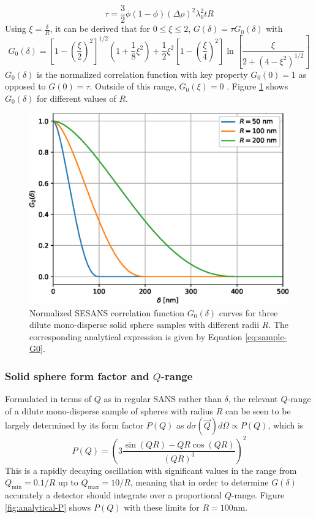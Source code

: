 \documentclass{article}
\begin{document}
\begin{equation}
	\tau = \frac{3}{2}\phi (1 - \phi) (\Delta\rho)^2\lambda_0^2tR \label{eq:sample-tau}
\end{equation}
Using $\xi = \frac{\delta}{R}$, it can be derived that for $0\leq \xi \leq 2$, $G(\delta) = \tau G_0(\delta)$ with 
\begin{equation}
	G_0(\delta) = \left[1 - \left(\frac{\xi}{2}\right)^2\right]^{1/2}\left(1 + \frac{1}{8}\xi^2\right) + \frac{1}{2}\xi^2\left[1 - \left(\frac{\xi}{4}\right)^2\right]\ln \left[\frac{\xi}{2 + (4 - \xi^2)^{1/2}}\right] \label{eq:sample-G0}
\end{equation}
$G_0(\delta)$ is the normalized correlation function with key property $G_0(0) = 1$ as opposed to $G(0) = \tau$. Outside of this range, $G_0(\xi) = 0$ \cite{krouglov2003}. Figure \ref{fig:analytical-G0} shows $G_0(\delta)$ for different values of $R$. 

\begin{figure}
	\centering
	\includegraphics[width=0.5\linewidth]{analytical-G0}
	\caption{Normalized SESANS correlation function $G_0(\delta)$ curves for three dilute mono-disperse solid sphere samples with different radii $R$. The corresponding analytical expression is given by Equation \eqref{eq:sample-G0}.}
	\label{fig:analytical-G0}
\end{figure}

\newpage

\subsubsection{Solid sphere form factor and $Q$-range}
Formulated in terms of $Q$ as in regular SANS rather than $\delta$, the relevant $Q$-range of a dilute mono-disperse sample of spheres with radius $R$ can be seen to be largely determined by its form factor $P(Q)$ as $d\sigma(\vec{Q})d\Omega\propto P(Q)$, which is \cite{rekveldt1996}
\begin{equation}
	P(Q) = \left(3\frac{\sin(QR) - QR\cos(QR)}{\left(QR\right)^3}\right)^2\label{eq:sample-form-factor}
\end{equation}
This is a rapidly decaying oscillation with significant values in the range from $Q_{\text{min}} = 0.1/R$ up to $Q_{\text{max}} = 10/R$, meaning that in order to determine $G(\delta)$ accurately a detector should integrate over a proportional $Q$-range.  Figure \ref{fig:analytical-P} shows $P(Q)$ with these limits for $R = 100\unit{\nano\meter}$.  
\end{document}
